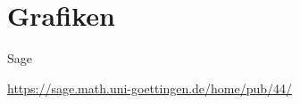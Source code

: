 \documentclass[hyperref={xetex}]{beamer}
\begin{document}
% 


\section{Grafiken}



\begin{frame}{Sage}
    \begin{center}
        \url{https://sage.math.uni-goettingen.de/home/pub/44/}
    \end{center}
\end{frame}


\end{document}
